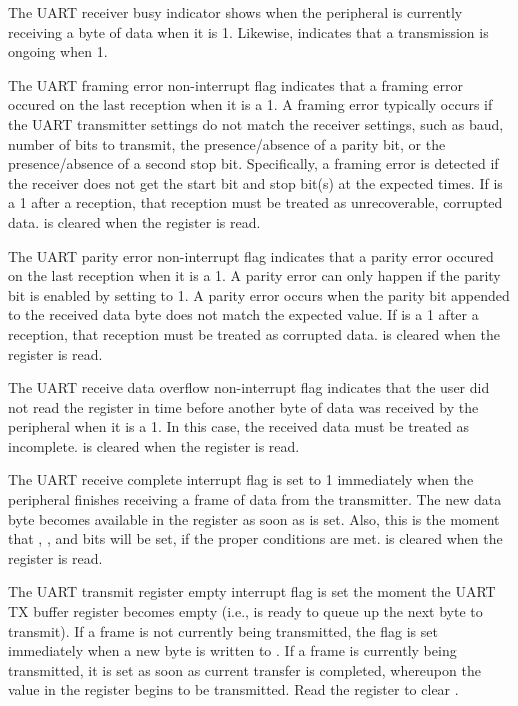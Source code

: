 The UART receiver busy indicator  shows when the  peripheral is currently receiving a byte of data when it is 1. Likewise,  indicates that a transmission is ongoing when 1.

The UART framing error non-interrupt flag  indicates that a framing error occured on the last reception when it is a 1. A framing error typically occurs if the UART transmitter settings do not match the receiver settings, such as baud, number of bits to transmit, the presence/absence of a parity bit, or the presence/absence of a second stop bit. Specifically, a framing error is detected if the receiver does not get the start bit and stop bit(s) at the expected times. If  is a 1 after a reception, that reception must be treated as unrecoverable, corrupted data.  is cleared when the  register is read.

The UART parity error non-interrupt flag  indicates that a parity error occured on the last reception when it is a 1. A parity error can only happen if the parity bit is enabled by setting  to 1. A parity error occurs when the parity bit appended to the received data byte does not match the expected value. If  is a 1 after a reception, that reception must be treated as corrupted data.  is cleared when the  register is read.

The UART receive data overflow non-interrupt flag  indicates that the user did not read the  register in time before another byte of data was received by the  peripheral when it is a 1. In this case, the received data must be treated as incomplete.  is cleared when the  register is read.

The UART receive complete interrupt flag  is set to 1 immediately when the  peripheral finishes receiving a frame of data from the transmitter. The new data byte becomes available in the  register as soon as  is set. Also, this is the moment that , , and  bits will be set, if the proper conditions are met.  is cleared when the  register is read.

The UART transmit register empty interrupt flag  is set the moment the UART TX buffer register  becomes empty (i.e., is ready to queue up the next byte to transmit). If a frame is not currently being transmitted, the flag is set immediately when a new byte is written to . If a frame is currently being transmitted, it is set as soon as current transfer is completed, whereupon the value in the  register begins to be transmitted. Read the  register to clear .

